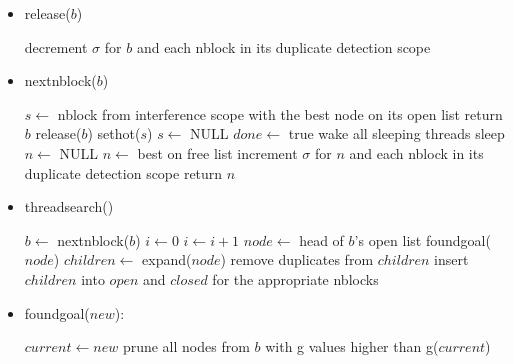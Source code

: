 \documentclass{article}
\begin{document}
\begin{itemize}
  \item release($b$)
  \begin{algorithmic}[1]
  \STATE decrement $\sigma$ for $b$ and each nblock in its duplicate detection scope
  \end{algorithmic}

  \item nextnblock($b$)
  \begin{algorithmic}[1]
    \STATE $s \leftarrow$ nblock from interference scope with the best node on its open list
      \STATE return $b$
    \ENDIF
    \STATE release($b$)
      \STATE sethot($s$)
    \ELSE
      \STATE $s \leftarrow$ NULL
    \ENDIF
  \ENDIF
    \STATE $done \leftarrow$ true
    \STATE wake all sleeping threads
  \ENDIF
    \STATE sleep
  \ENDWHILE
    \STATE $n \leftarrow$ NULL
  \ELSE
    \STATE $n \leftarrow$ best on free list
    \STATE increment $\sigma$ for $n$ and each nblock in its duplicate detection scope
  \ENDIF
  \STATE return $n$
  \end{algorithmic}

  \item threadsearch()
  \begin{algorithmic}[1]
    \STATE $b \leftarrow$ nextnblock($b$)
      \STATE $i \leftarrow 0$
    \ENDIF
      \STATE $i \leftarrow i+1$
      \STATE $node \leftarrow$ head of $b$'s open list
        \STATE foundgoal($node$)
        \STATE $children \leftarrow$ expand($node$)
        \STATE remove duplicates from $children$
        \STATE insert $children$ into $open$ and $closed$ for the appropriate nblocks
      \ENDIF
    \ENDWHILE
  \ENDWHILE
  \end{algorithmic}

  \item foundgoal($new$):
  \begin{algorithmic}[1]
        \STATE $current \leftarrow new$
        \STATE prune all nodes from $b$ with g values higher than g($current$)
      \ENDIF
  \end{algorithmic}
\end{itemize}
\end{document}
